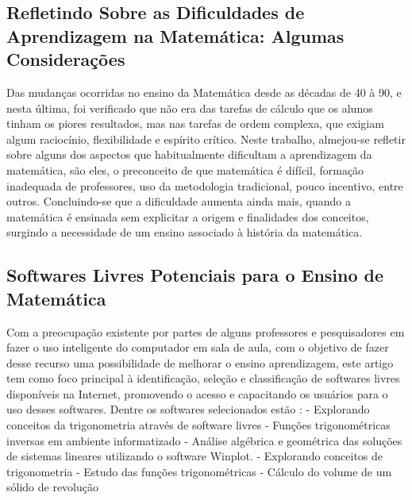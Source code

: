 \documentclass[12pt,a4paper]{article}
\begin{document}
\subsection{Refletindo Sobre as Dificuldades de Aprendizagem na Matemática: Algumas Considerações}
Das mudanças ocorridas no ensino da Matemática desde as décadas de 40 à 90, e nesta última, foi verificado que não era das tarefas de cálculo que os alunos tinham os piores resultados, mas nas tarefas de ordem complexa, que exigiam algum raciocínio, flexibilidade e espírito crítico.
Neste trabalho, almejou-se refletir sobre alguns dos aspectos que habitualmente dificultam a aprendizagem da matemática, são eles, o preconceito de que matemática é difícil, formação inadequada de professores, uso da metodologia tradicional, pouco incentivo, entre outros. Concluindo-se que a dificuldade aumenta ainda mais, quando a matemática é ensinada sem explicitar a origem e finalidades dos conceitos, surgindo a necessidade de um ensino associado à história da matemática.

\subsection{Softwares Livres Potenciais para o Ensino de Matemática}
Com a preocupação existente por partes de alguns professores e pesquisadores em fazer o uso inteligente do computador em sala de aula, com o objetivo de fazer desse recurso uma possibilidade de melhorar o ensino aprendizagem, este artigo tem como foco principal à identificação, seleção e classificação de softwares livres disponíveis na Internet, promovendo o acesso e capacitando os usuários para o uso desses softwares. 
Dentre os softwares selecionados estão :
- Explorando conceitos da trigonometria através de software livres
- Funções trigonométricas inversas em ambiente informatizado
- Análise algébrica e geométrica das soluções de sistemas lineares utilizando o software Winplot.
- Explorando conceitos de trigonometria
- Estudo das funções trigonométricas
- Cálculo do volume de um sólido de revolução
\end{document}
